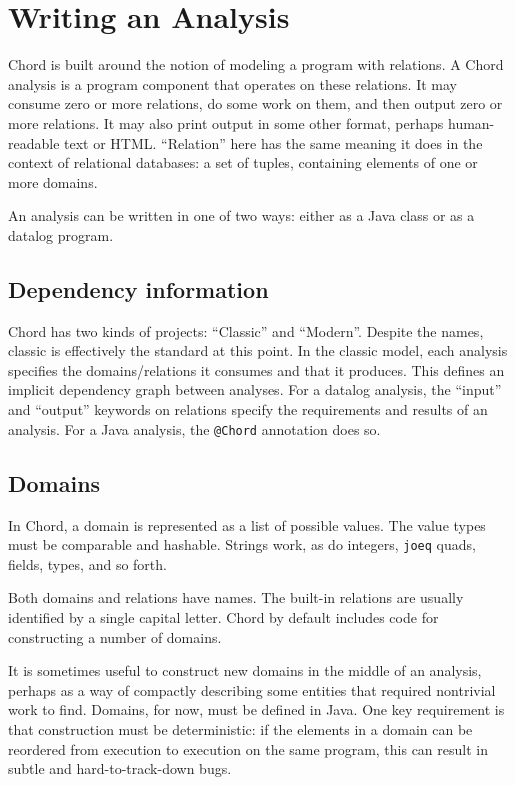\section{Writing an Analysis}
\label{sec:writing-analysis}

Chord is built around the notion of modeling a program with relations.
A Chord analysis is a program component that operates on these relations.
It may consume zero or more relations, do some work on them, and then output zero or more relations.
It may also print output in some other format, perhaps human-readable text or HTML.
``Relation'' here has the same meaning it does in the context of relational databases: a set of tuples, containing elements of one or more domains.  


An analysis can be written in one of two ways: either as a Java class or as a datalog program. 

\subsection{Dependency information}

Chord has two kinds of projects: ``Classic'' and ``Modern''.  Despite the names, classic is effectively the standard at this point.
In the classic model, each analysis specifies the domains/relations it consumes and that it produces.
This defines an implicit dependency graph between analyses.  For a datalog analysis, the ``input'' and ``output'' keywords on relations specify the requirements and results of an analysis.  For a Java analysis, the \texttt{@Chord} annotation does so. 



\subsection{Domains}

In Chord, a domain is represented as a list of possible values. 
The value types must be comparable and hashable.
Strings work, as do integers, \texttt{joeq} quads, fields, types, and so forth. 
%

Both domains and relations have names. The built-in relations are usually identified by a single capital letter.
Chord by default includes code for constructing a number of domains.

It is sometimes useful to construct new domains in the middle of an analysis, perhaps as a way of compactly describing some entities that required nontrivial work to find. Domains, for now, must be defined in Java. One key requirement is that construction must be deterministic: if the elements in a domain can be reordered from execution to execution on the same program, this can result in subtle and hard-to-track-down bugs.


